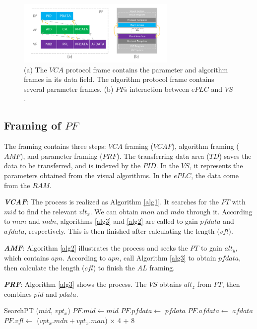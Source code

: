 \documentclass[journal,UTF8]{IEEEtran}
\begin{document}
	
	\begin{figure}
		\centering
		\includegraphics[width=3in]{fig/Protocol.pdf}
		\caption{ (a) The $VCA$ protocol frame contains the parameter and algorithm frames in its data field. The algorithm protocol frame contains several parameter frames. (b) $PF$s interaction between $ePLC$ and $VS$.}
		\label{fig:Protocol}
	\end{figure}
	\subsection{Framing of $PF$}
	The framing contains three steps: $VCA$ framing ($VCAF$), algorithm framing ($AMF$), and parameter framing ($PRF$). The transferring data area ($TD$) saves the data to be transferred, and is indexed by the $PID$. In the $VS$, it represents the parameters obtained from the visual algorithms. In the $ePLC$, the data come from the $RAM$.   
	
	
	\textbf{\emph{VCAF}}: The process is realized as Algorithm \ref{alg1}. It searches for the $PT$ with $mid$ to find the relevant $vlt_x$. We can obtain $man$ and $mdn$ through it. According to $man$ and $mdn$, algorithms \ref{alg3} and \ref{alg2} are called to gain $pfdata$ and $afdata$, respectively. This is then finished after calculating the length ($vfl$).
	
	\textbf{\emph{AMF}}: Algorithm \ref{alg2} illustrates the process and seeks the $PT$ to gain $alt_y$, which contains $apn$. According to $apn$, call Algorithm \ref{alg3} to obtain $pfdata$, then calculate the length ($cfl$) to finish the $AL$ framing.  
	
	\textbf{\emph{PRF}}: Algorithm \ref{alg3} shows the process. The $VS$ obtains $alt_z$ from $FT$, then combines $pid$ and $pdata$.
	
	
	\begin{algorithm}
		\label{alg1}
		\caption{$VCAF$}%
		SearchPT ($mid$, $vpt_x$)\;
		$PF.mid\leftarrow mid$\; 
		$PF.pfdata\leftarrow$ $pfdata$\; 
		$PF.afdata\leftarrow$ $afdata$\; 
		$PF.vfl\leftarrow$ ($vpt_x.mdn+vpt_x.man$) $\times$ 4 + 8\;
	\end{algorithm}
	
\end{document}
